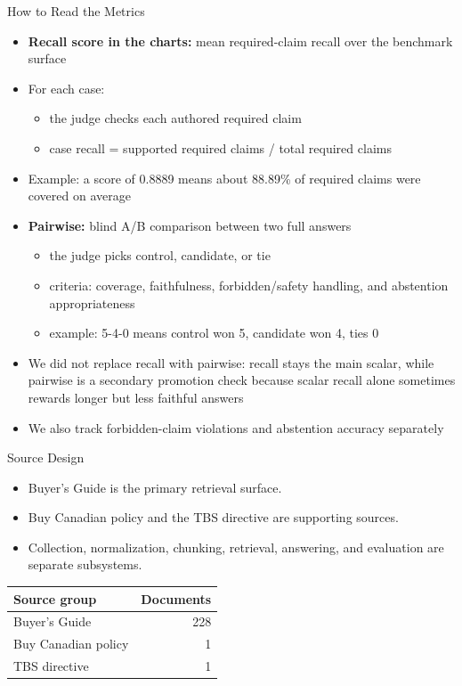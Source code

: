 \documentclass[aspectratio=169]{beamer}
\begin{document}
\begin{frame}{How to Read the Metrics}
  \begin{itemize}
    \item \textbf{Recall score in the charts:} mean required-claim recall over the benchmark surface
    \item For each case:
      \begin{itemize}
        \item the judge checks each authored required claim
        \item case recall = supported required claims / total required claims
      \end{itemize}
    \item Example: a score of 0.8889 means about 88.89\% of required claims were covered on average
    \item \textbf{Pairwise:} blind A/B comparison between two full answers
      \begin{itemize}
        \item the judge picks control, candidate, or tie
        \item criteria: coverage, faithfulness, forbidden/safety handling, and abstention appropriateness
        \item example: 5-4-0 means control won 5, candidate won 4, ties 0
      \end{itemize}
    \item We did not replace recall with pairwise: recall stays the main scalar, while pairwise is a secondary promotion check because scalar recall alone sometimes rewards longer but less faithful answers
    \item We also track forbidden-claim violations and abstention accuracy separately
  \end{itemize}
\end{frame}

\begin{frame}{Source Design}
  \begin{itemize}
    \item Buyer’s Guide is the primary retrieval surface.
    \item Buy Canadian policy and the TBS directive are supporting sources.
    \item Collection, normalization, chunking, retrieval, answering, and evaluation are separate subsystems.
  \end{itemize}

  \vspace{0.5em}
  \centering
  \begin{tabular}{lr}
    \toprule
    Source group & Documents \\
    \midrule
    Buyer’s Guide & 228 \\
    Buy Canadian policy & 1 \\
    TBS directive & 1 \\
    \bottomrule
  \end{tabular}
\end{frame}
\end{document}
